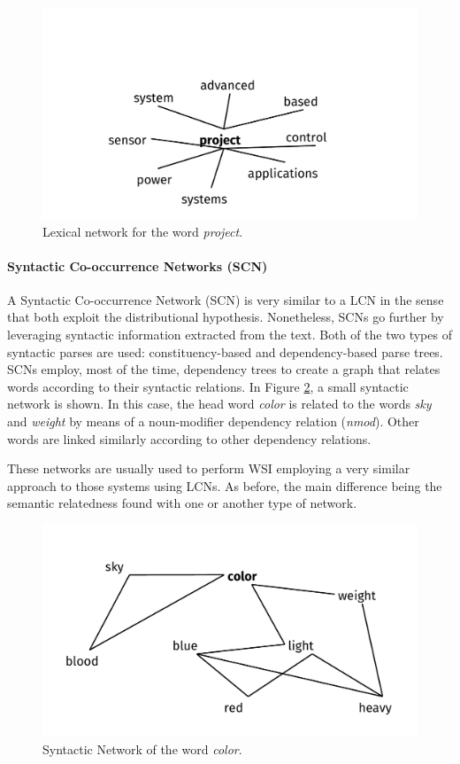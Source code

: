 \begin{figure}[!h]
\centering
\includegraphics[width=0.8\linewidth]{images/Chapitre2/lex_net1.pdf}
\caption{Lexical network for the word \textit{project}.}
\label{fig:lex_net1}
\end{figure}


\paragraph{Syntactic Co-occurrence Networks (SCN)}
A Syntactic Co-occurrence Network (SCN) is very similar to a LCN  in the sense that both exploit the distributional hypothesis. Nonetheless, SCNs go further by leveraging  syntactic information extracted from the text. Both of the two types of syntactic parses are used: constituency-based  and dependency-based parse trees. SCNs employ, most of the time, dependency trees to create a graph that relates words according to their syntactic relations.  In Figure \ref{fig:syn_net1}, a small syntactic network is shown. In this case, the head word \textit{color} is related to the words \textit{sky} and \textit{weight} by means of a noun-modifier dependency relation  (\textit{nmod}). Other words are linked similarly according to other dependency relations.

 These networks are usually used to perform WSI employing a very similar approach to those systems using LCNs. As before, the main difference being the semantic relatedness found with one or another type of network.


\begin{figure}[!h]
\centering
\includegraphics[width=0.7\linewidth]{images/Chapitre2/syn_net1.pdf}
\caption{Syntactic Network of the word \textit{color}.}
\label{fig:syn_net1}
\end{figure}

